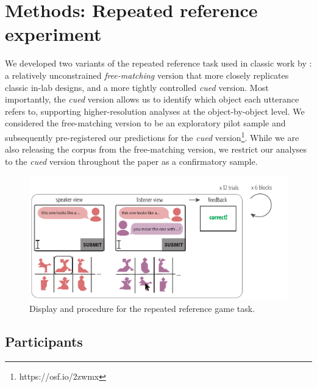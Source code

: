 \documentclass[alpha-refs]{wiley-article}
\begin{document}




\section{Methods: Repeated reference experiment}

We developed two variants of the repeated reference task used in classic work by \cite{ClarkWilkesGibbs86_ReferringCollaborative}: a relatively unconstrained \emph{free-matching} version that more closely replicates classic in-lab designs, and a more tightly controlled \emph{cued} version. 
Most importantly, the \emph{cued} version allows us to identify which object each utterance refers to, supporting higher-resolution analyses at the object-by-object level.
We considered the free-matching version to be an exploratory pilot sample and subsequently pre-registered our predictions for the \emph{cued} version\footnote{https://osf.io/2zwmx}.
While we are also releasing the corpus from the free-matching version, we restrict our analyses to the \emph{cued} version throughout the paper as a confirmatory sample.

\begin{figure}
\centering
\includegraphics[scale=.9]{designAndExample.pdf}
\caption{Display and procedure for the repeated reference game task.}
\label{fig:design}
\end{figure}


\subsection{Participants}\label{participants}
\end{document}
